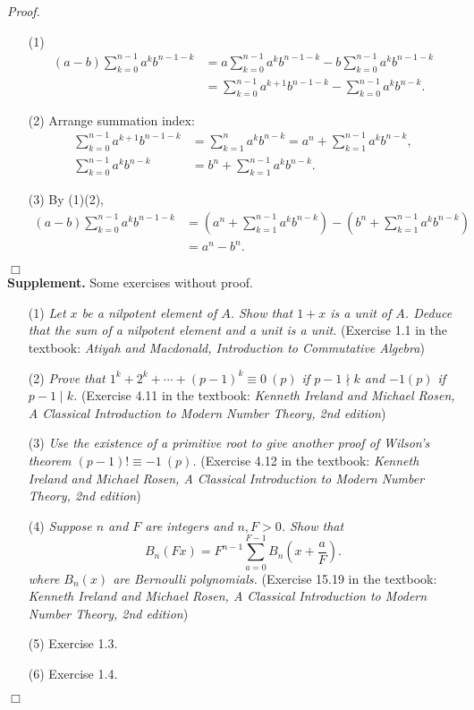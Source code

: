 \documentclass{article}
\begin{document}
\emph{Proof.}
\begin{enumerate}
\item[(1)]
\begin{align*}
(a - b) \sum_{k=0}^{n-1} a^k b^{n-1-k}
&= a \sum_{k=0}^{n-1} a^k b^{n-1-k} - b \sum_{k=0}^{n-1} a^k b^{n-1-k} \\
&= \sum_{k=0}^{n-1} a^{k+1} b^{n-1-k} - \sum_{k=0}^{n-1} a^k b^{n-k}.
\end{align*}
\item[(2)] Arrange summation index:
\begin{align*}
\sum_{k=0}^{n-1} a^{k+1} b^{n-1-k}
&= \sum_{k=1}^{n} a^{k} b^{n-k}
= a^n + \sum_{k=1}^{n-1} a^{k} b^{n-k}, \\
\sum_{k=0}^{n-1} a^k b^{n-k}
&= b^n + \sum_{k=1}^{n-1} a^{k} b^{n-k}.
\end{align*}
\item[(3)]
By (1)(2),
\begin{align*}
(a - b) \sum_{k=0}^{n-1} a^k b^{n-1-k}
&= \left( a^n + \sum_{k=1}^{n-1} a^{k} b^{n-k} \right)
- \left( b^n + \sum_{k=1}^{n-1} a^{k} b^{n-k} \right) \\
&= a^n - b^n.
\end{align*}
\end{enumerate}
$\Box$ \\

\textbf{Supplement.} Some exercises without proof.
\begin{enumerate}
\item[(1)]
\emph{Let $x$ be a nilpotent element of $A$.
Show that $1+x$ is a unit of $A$.
Deduce that the sum of a nilpotent element and a unit is a unit.}
(Exercise 1.1 in the textbook: \emph{Atiyah and Macdonald,
Introduction to Commutative Algebra})

\item[(2)]
\emph{Prove that $1^k + 2^k + \cdots + (p-1)^k \equiv 0 \: (p)$
if $p - 1 \nmid k$ and $-1 (p)$ if $p - 1 \mid k$.}
(Exercise 4.11 in the textbook: \emph{Kenneth Ireland and Michael Rosen,
A Classical Introduction to Modern Number Theory, 2nd edition})

\item[(3)]
\emph{Use the existence of a primitive root to give another proof
of Wilson's theorem $(p - 1)! \equiv -1 \: (p)$.}
(Exercise 4.12 in the textbook: \emph{Kenneth Ireland and Michael Rosen,
A Classical Introduction to Modern Number Theory, 2nd edition})

\item[(4)]
\emph{Suppose $n$ and $F$ are integers and $n, F > 0$. Show that
$$B_n(Fx) = F^{n-1} \sum_{a=0}^{F-1} B_n \left(x + \frac{a}{F} \right).$$
where $B_n(x)$ are Bernoulli polynomials.}
(Exercise 15.19 in the textbook: \emph{Kenneth Ireland and Michael Rosen,
A Classical Introduction to Modern Number Theory, 2nd edition})

\item[(5)]
Exercise 1.3.

\item[(6)]
Exercise 1.4.
\end{enumerate}
$\Box$ \\\\
\end{document}

